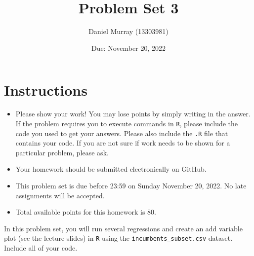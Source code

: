 \documentclass[12pt,letterpaper]{article}
\title{Problem Set 3}
\date{Due: November 20, 2022}
\author{Daniel Murray (13303981)}
\begin{document}
	\maketitle
	\section*{Instructions}
	\begin{itemize}
		\item Please show your work! You may lose points by simply writing in the answer. If the problem requires you to execute commands in \texttt{R}, please include the code you used to get your answers. Please also include the \texttt{.R} file that contains your code. If you are not sure if work needs to be shown for a particular problem, please ask.
	\item Your homework should be submitted electronically on GitHub.
	\item This problem set is due before 23:59 on Sunday November 20, 2022. No late assignments will be accepted.
	\item Total available points for this homework is 80.
	\end{itemize}

		\vspace{.25cm}
	
\noindent In this problem set, you will run several regressions and create an add variable plot (see the lecture slides) in \texttt{R} using the \texttt{incumbents\_subset.csv} dataset. Include all of your code.

	\vspace{.5cm}
\end{document}
